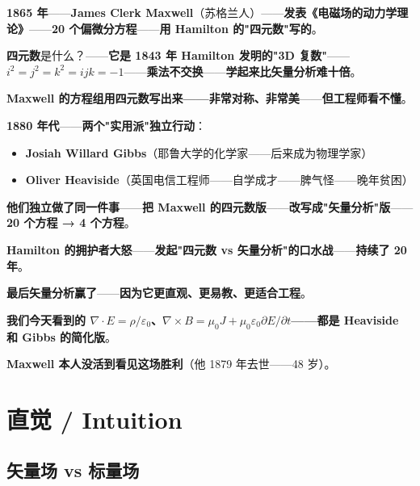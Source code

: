 \begin{tcolorbox}[storybox={\Large 小故事：Maxwell, Gibbs, Heaviside 的矢量发明}]
\textbf{1865 年}——\textbf{James Clerk Maxwell}（苏格兰人）——\textbf{发表《电磁场的动力学理论》}——\textbf{20 个偏微分方程}——\textbf{用 Hamilton 的"四元数"写的}。

\medskip

\textbf{四元数}是什么？——\textbf{它是 1843 年 Hamilton 发明的"3D 复数"}——\textbf{$i^2 = j^2 = k^2 = ijk = -1$}——\textbf{乘法不交换}——\textbf{学起来比矢量分析难十倍}。

\medskip

\textbf{Maxwell 的方程组用四元数写出来——非常对称、非常美}——\textbf{但工程师看不懂}。

\medskip

\textbf{1880 年代}——\textbf{两个"实用派"独立行动}：

\begin{itemize}
\item \textbf{Josiah Willard Gibbs}（耶鲁大学的化学家——后来成为物理学家）
\item \textbf{Oliver Heaviside}（英国电信工程师——自学成才——脾气怪——晚年贫困）
\end{itemize}

\medskip

\textbf{他们独立做了同一件事}——\textbf{把 Maxwell 的四元数版}——\textbf{改写成"矢量分析"版}——\textbf{20 个方程 → 4 个方程}。

\medskip

\textbf{Hamilton 的拥护者大怒}——\textbf{发起"四元数 vs 矢量分析"的口水战}——\textbf{持续了 20 年}。

\medskip

\textbf{最后矢量分析赢了}——\textbf{因为它更直观、更易教、更适合工程}。

\medskip

\textbf{我们今天看到的 $\nabla \cdot E = \rho / \varepsilon_0$、$\nabla \times B = \mu_0 J + \mu_0 \varepsilon_0 \partial E / \partial t$——都是 Heaviside 和 Gibbs 的简化版}。

\medskip

\textbf{Maxwell 本人没活到看见这场胜利}（他 1879 年去世——48 岁）。
\end{tcolorbox}

\section{直觉 / Intuition}

\subsection{矢量场 vs 标量场}

